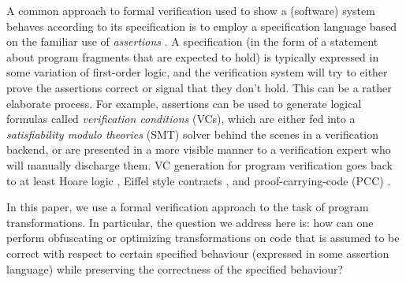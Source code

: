 \documentclass[compsoc,conference,a4paper,10pt,times]{IEEEtran}
\begin{document}
A common approach to formal verification used to show a (software) system behaves according to its specification is to employ a specification language based on the familiar use of \emph{assertions} \cite{Floyd,Hoare}. A specification (in the form of a statement about program fragments that are expected to hold) is typically expressed in some variation of first-order logic, and the verification system will try to either prove the assertions correct or signal that they don't hold. This can be a rather elaborate process.  For example, assertions can be used to generate logical formulas called \emph{verification conditions} (VCs), which are either fed into a \emph{satisfiability modulo theories} (SMT) solver behind the scenes in a verification backend, or are presented in a more visible manner to a verification expert who will manually discharge them. VC generation for program verification goes back to at least Hoare logic \cite{Hoare}, Eiffel style contracts \cite{Eiffel}, and proof-carrying-code (PCC) \cite{b7}.

In this paper, we use a formal verification approach to the task of program transformations.
In particular, the question we address here is:
how can one perform obfuscating or optimizing transformations on code that is assumed to be correct with respect to certain specified behaviour (expressed in some assertion language) while preserving the correctness of the specified behaviour?
\end{document}
